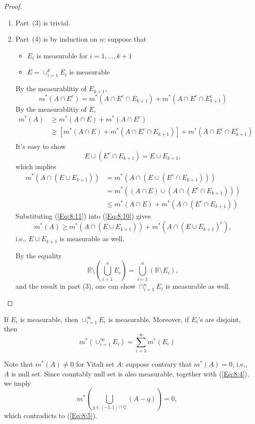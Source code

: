 \begin{proof}
\begin{enumerate}
\item
Part~(3) is trivial.
\item
Part~(4) is by induction on $n$:
suppose that
\begin{itemize}
\item
$E_i$ is measurable for $i=1,\dots,k+1$
\item
$E=\cup_{i=1}^kE_i$ is measurable
\end{itemize}
By the measurablitiy of $E_{k+1}$,
\begin{equation}\label{Eq:8:9}
m^*(A\cap E^c) = m^*(A\cap E^c\cap E_{k+1})+m^*(A\cap E^c\cap E_{k+1}^c)
\end{equation}
By the measurablitiy of $E$,
\begin{equation}\label{Eq:8:10}
\begin{aligned}
m^*(A)&\ge m^*(A\cap E)+m^*(A\cap E^c)\\&\ge
 [m^*(A\cap E)+m^*(A\cap E^c\cap E_{k+1})]+m^*(A\cap E^c\cap E_{k+1}^c)\\
\end{aligned}
\end{equation}
It's easy to show
\[
E\cup(E^c\cap E_{k+1})=E\cup E_{k+1},
\]
which implies
\begin{equation}\label{Eq:8:11}
\begin{aligned}
m^*(A\cap (E\cup E_{k+1}))&=m^*(A\cap (E\cup(E^c\cap E_{k+1})))\\
&=m^*((A\cap E)\cup(A\cap (E^c\cap E_{k+1})))\\
&\le m^*(A\cap E)+m^*(A\cap (E^c\cap E_{k+1}))
\end{aligned}
\end{equation}
Substituting (\ref{Eq:8:11}) into (\ref{Eq:8:10}) gives
\[
m^*(A)\ge m^*(A\cap (E\cup E_{k+1}))+m^*(A\cap (E\cup E_{k+1})^c),
\]
i.e., $E\cup E_{k+1}$ is measurable as well.

By the equality
\[
\mathbb{R}\setminus\left(\bigcup_{i=1}^n E_i\right) = \bigcup_{i=1}^n(\mathbb{R}\setminus E_i),
\]
and the result in part (3), one can show $\cap_{i=1}^n E_i$ is measurable as well.
\end{enumerate}
\end{proof}


\begin{proposition}
If $E_i$ is measurable, then $\cup_{i=1}^\infty E_i$ is measurable.
Moreover, if $E_i$'s are disjoint, then
\[
m^*(\cup_{i=1}^\infty E_i) = \sum_{i=1}^\infty m^*(E_i)
\]
\end{proposition}

\begin{remark}
Note that $m^*(A)\ne0$ for Vitali set $A$: suppose contrary that $m^*(A)=0$, i.e., $A$ is null set.
Since countably null set is also measurable, together with (\ref{Eq:8:4}), we imply
\[
m^*\left(\bigcup_{q\in[-1,1]\cap\mathbb{Q}}(A-q)\right)=0,
\]
which contradicts to (\ref{Eq:8:5}).
\end{remark}

